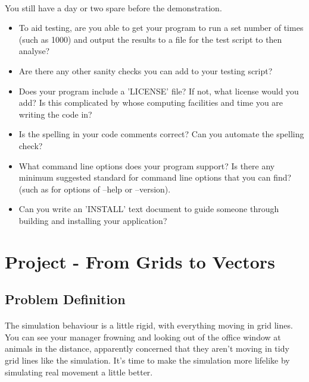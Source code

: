 \documentclass[11pt]{book}
\begin{document}
\paragraph{} You still have a day or two spare before the demonstration.

\begin{itemize}
\item To aid testing, are you able to get your program to run a set number of times (such as 1000) and output the results to a file for the test script to then analyse?
\item Are there any other sanity checks you can add to your testing script?
\item Does your program include a 'LICENSE' file? If not, what license would you add? Is this complicated by whose computing facilities and time you are writing the code in?
\item Is the spelling in your code comments correct? Can you automate the spelling check?
\item What command line options does your program support? Is there any minimum suggested standard for command line options that you can find? (such as for options of --help or --version).
\item Can you write an 'INSTALL' text document to guide someone through building and installing your application?
\end{itemize}

\clearpage

\section{Project - From Grids to Vectors}

\subsection{Problem Definition}

\paragraph{}  The simulation behaviour is a little rigid, with everything
moving in grid lines. You can see your manager frowning and looking out of the
office window at animals in the distance, apparently concerned that they
aren't moving in tidy grid lines like the simulation. It's time to make the
simulation more lifelike by simulating real movement a little better.
\end{document}
